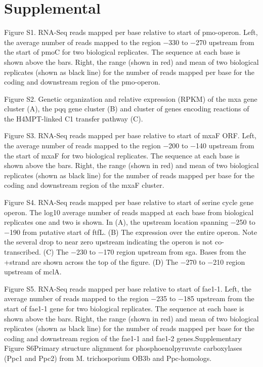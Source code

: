 \section{Supplemental}

Figure S1. RNA-Seq reads mapped per base relative to start of pmo-operon. Left, the average number of reads mapped to the region −330 to −270 upstream from the start of pmoC for two biological replicates. The sequence at each base is shown above the bars. Right, the range (shown in red) and mean of two biological replicates (shown as black line) for the number of reads mapped per base for the coding and downstream region of the pmo-operon.

Figure S2. Genetic organization and relative expression (RPKM) of the mxa gene cluster (A), the pqq gene cluster (B) and cluster of genes encoding reactions of the H4MPT-linked C1 transfer pathway (C).

Figure S3. RNA-Seq reads mapped per base relative to start of mxaF ORF. Left, the average number of reads mapped to the region −200 to −140 upstream from the start of mxaF for two biological replicates. The sequence at each base is shown above the bars. Right, the range (shown in red) and mean of two biological replicates (shown as black line) for the number of reads mapped per base for the coding and downstream region of the mxaF cluster.

Figure S4. RNA-Seq reads mapped per base relative to start of serine cycle gene operon. The log10 average number of reads mapped at each base from biological replicates one and two is shown. In (A), the upstream location spanning −250 to −190 from putative start of ftfL. (B) The expression over the entire operon. Note the several drop to near zero upstream indicating the operon is not co-transcribed. (C) The −230 to −170 region upstream from sga. Bases from the +strand are shown across the top of the figure. (D) The −270 to −210 region upstream of mclA.

Figure S5. RNA-Seq reads mapped per base relative to start of fae1-1. Left, the average number of reads mapped to the region −235 to −185 upstream from the start of fae1-1 gene for two biological replicates. The sequence at each base is shown above the bars. Right, the range (shown in red) and mean of two biological replicates (shown as black line) for the number of reads mapped per base for the coding and downstream region of the fae1-1 and fae1-2 genes.Supplementary Figure S6Primary structure alignment for phosphoenolpyruvate carboxylases (Ppc1 and Ppc2) from M. trichosporium OB3b and Ppc-homologs.


